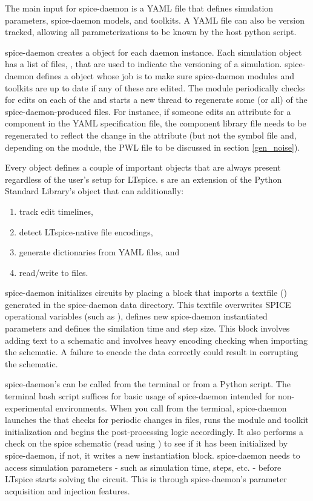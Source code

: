 The main input for spice-daemon is a YAML file that defines simulation parameters, spice-daemon models, and
toolkits. A YAML file can also be version tracked, allowing all parameterizations to be known by the host
python script. 

spice-daemon creates a  object for each daemon instance. Each simulation
object has a list of files, , that are used to indicate the versioning
of a simulation. spice-daemon defines a  object whose job is to make sure
spice-daemon modules and toolkits are up to date if any of these 
are edited. 
The  module periodically checks for edits on each of the 
and starts a new thread to regenerate some (or all) of the spice-daemon-produced files.
For instance, if someone edits an attribute for a component in the YAML specification file, 
the component library file needs to be regenerated to reflect the change in the attribute (but not the symbol file and, depending on the module, the PWL file to be discussed in section \ref{gen_noise}).

Every  object defines a couple of important  objects that are always present regardless
of the user's setup for LTspice. s are an extension of the Python Standard Library's  object that can additionally:
\begin{enumerate}
    \item track edit timelines,
    \item detect LTspice-native file encodings,
    \item generate dictionaries from YAML files, and
    \item read/write to files.
\end{enumerate}

spice-daemon initializes circuits by placing a block that imports a textfile () 
generated
in the spice-daemon data directory. This textfile overwrites SPICE operational variables
(such as ), defines new spice-daemon instantiated parameters and defines the
similation time and step size. This block involves adding text to a schematic and involves
heavy encoding checking when importing the schematic. A failure to encode the data correctly
could result in corrupting the schematic.

spice-daemon's  can be called from the terminal or from a Python script. The terminal
bash script suffices for basic usage of spice-daemon intended for non-experimental environments.
When you call  from the terminal, spice-daemon launches the  that checks for 
periodic changes in files, runs the module and toolkit initialization and begins the post-processing logic
accordingly. It also performs a check on the spice schematic (read using )
to see if it has been initialized
by spice-daemon, if not, it writes a new instantiation block.
spice-daemon needs to access simulation parameters - such as simulation time, steps, etc. -
before LTspice starts solving the circuit. This is through spice-daemon's parameter acquisition and injection 
features. 

